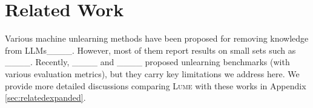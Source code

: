\section{Related Work}
Various machine unlearning methods have been proposed for removing knowledge from LLMs____. However, most of them report results on small sets such as ____. Recently, ____ and ____ proposed unlearning benchmarks (with various evaluation metrics), but they carry key limitations we address here. We provide more detailed discussions comparing \textsc{Lume} with these works in Appendix \ref{sec:relatedexpanded}.